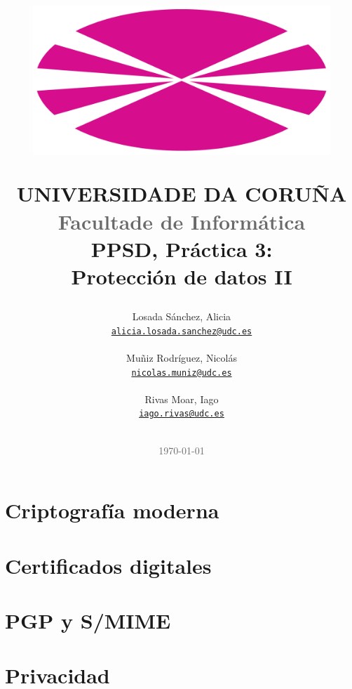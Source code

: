 \documentclass[12pt,a4paper]{article}
\title{
    \begin{figure}[H]
        \begin{center}
        \includegraphics[scale=0.35]{UDC.png}       %
        \end{center}
        \label{fig:udc}
    \end{figure}

    \textsf{UNIVERSIDADE DA CORUÑA} \\
    \textsf{\textcolor{dimGray}{\Large Facultade de Informática}} \\

    \vspace{3cm}
    \textbf{PPSD, Práctica 3: \\ Protección de datos II}
}
\author{
    Losada Sánchez, Alicia \\
    \texttt{\href{mailto:alicia.losada.sanchez@udc.es}{alicia.losada.sanchez@udc.es}}
    \\ \\
    Muñiz Rodríguez, Nicolás \\
    \texttt{\href{mailto:nicolas.muniz@udc.es}{nicolas.muniz@udc.es}}
    \\ \\
    Rivas Moar, Iago \\
    \texttt{\href{mailto:iago.rivas@udc.es}{iago.rivas@udc.es}}
    \\ \\
    \vspace{5cm}
}
\date{\textcolor{dimGray}{\textsf\today}}
\begin{document}
\maketitle

\thispagestyle{empty}

\newpage
{}

\tableofcontents
\thispagestyle{fancy}

\newpage
\fancyfoot[C]{\thepage}


\section{Criptografía moderna}




\section{Certificados digitales}



\section{PGP y S/MIME}







\section{Privacidad}








\newpage
{}


\end{document}
